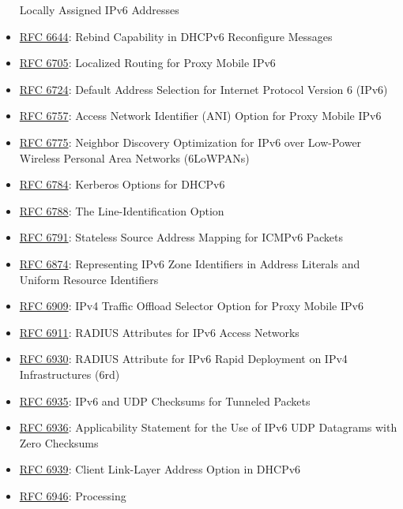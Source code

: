 \documentclass[
]{article}
\begin{document}
\begin{itemize}
  Locally Assigned IPv6 Addresses
\item
  \href{https://www.rfc-editor.org/info/rfc6644}{RFC 6644}: Rebind
  Capability in DHCPv6 Reconfigure Messages
\item
  \href{https://www.rfc-editor.org/info/rfc6705}{RFC 6705}: Localized
  Routing for Proxy Mobile IPv6
\item
  \href{https://www.rfc-editor.org/info/rfc6724}{RFC 6724}: Default
  Address Selection for Internet Protocol Version 6 (IPv6)
\item
  \href{https://www.rfc-editor.org/info/rfc6757}{RFC 6757}: Access
  Network Identifier (ANI) Option for Proxy Mobile IPv6
\item
  \href{https://www.rfc-editor.org/info/rfc6775}{RFC 6775}: Neighbor
  Discovery Optimization for IPv6 over Low-Power Wireless Personal Area
  Networks (6LoWPANs)
\item
  \href{https://www.rfc-editor.org/info/rfc6784}{RFC 6784}: Kerberos
  Options for DHCPv6
\item
  \href{https://www.rfc-editor.org/info/rfc6788}{RFC 6788}: The
  Line-Identification Option
\item
  \href{https://www.rfc-editor.org/info/rfc6791}{RFC 6791}: Stateless
  Source Address Mapping for ICMPv6 Packets
\item
  \href{https://www.rfc-editor.org/info/rfc6874}{RFC 6874}: Representing
  IPv6 Zone Identifiers in Address Literals and Uniform Resource
  Identifiers
\item
  \href{https://www.rfc-editor.org/info/rfc6909}{RFC 6909}: IPv4 Traffic
  Offload Selector Option for Proxy Mobile IPv6
\item
  \href{https://www.rfc-editor.org/info/rfc6911}{RFC 6911}: RADIUS
  Attributes for IPv6 Access Networks
\item
  \href{https://www.rfc-editor.org/info/rfc6930}{RFC 6930}: RADIUS
  Attribute for IPv6 Rapid Deployment on IPv4 Infrastructures (6rd)
\item
  \href{https://www.rfc-editor.org/info/rfc6935}{RFC 6935}: IPv6 and UDP
  Checksums for Tunneled Packets
\item
  \href{https://www.rfc-editor.org/info/rfc6936}{RFC 6936}:
  Applicability Statement for the Use of IPv6 UDP Datagrams with Zero
  Checksums
\item
  \href{https://www.rfc-editor.org/info/rfc6939}{RFC 6939}: Client
  Link-Layer Address Option in DHCPv6
\item
  \href{https://www.rfc-editor.org/info/rfc6946}{RFC 6946}: Processing

\end{itemize}
\end{document}
